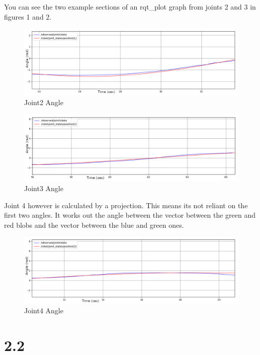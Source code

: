 \documentclass{report}
\begin{document}
You can see the two example sections of an rqt\_plot graph from joints 2 and 3 in figures 1 and 2.

\begin{figure}
    \includegraphics[width=\linewidth]{joint2.png}
    \caption{Joint2 Angle}
    \label{fig:Something}
\end{figure}

\begin{figure}
    \includegraphics[width=\linewidth]{joint3.png}
    \caption{Joint3 Angle}
\end{figure}

Joint 4 however is calculated by a projection. This means its not reliant on the first two angles. It works out the angle between the vector between the
green and red blobs and the vector between the blue and green ones.

\begin{figure}
    \includegraphics[width=\linewidth]{joint4.png}
    \caption{Joint4 Angle}
\end{figure}

\section*{2.2}
\end{document}
